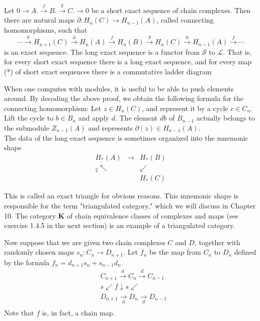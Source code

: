   
  \begin{theo}
      Let $0 \rightarrow A . \xrightarrow{f} B . \xrightarrow{g} C . \rightarrow 0$ be a short exact sequence of chain complexes. Then there are natural maps $\partial: H_n(C) \rightarrow H_{n-1}(A)$, called connecting homomorphisms, such that
      $$
      \cdots \xrightarrow{g} H_{n+1}(C) \xrightarrow{\partial} H_n(A) \xrightarrow{f} H_n(B) \xrightarrow{g} H_n(C) \xrightarrow{\partial} H_{n-1}(A) \xrightarrow{f} \cdots
      $$
      is an exact sequence. The long exact sequence is a functor from $\mathcal{S}$ to $\mathcal{L}$. That is, for every short exact sequence there is a long exact sequence, and for every map (*) of short exact sequences there is a commutative ladder diagram
      \end{theo}
      
      When one computes with modules, it is useful to be able to push elements around. By decoding the above proof, we obtain the following formula for the connecting homomorphism: Let $z \in H_n(C)$, and represent it by a cycle $c \in C_n$. Lift the cycle to $b \in B_n$ and apply $d$. The element $d b$ of $B_{n-1}$ actually belongs to the submodule $Z_{n-1}(A)$ and represents $\partial(z) \in H_{n-1}(A)$.\\

The data of the long exact sequence is sometimes organized into the mnemonic shape
      $$
      \begin{array}{ccc}
      H_*(A) & \longrightarrow & H_*(B) \\
      { }_2 \nwarrow & & \swarrow \\
      & & H_*(C)
      \end{array}
      $$
      
      This is called an exact triangle for obvious reasons. This mnemonic shape is responsible for the term "triangulated category," which we will discuss in Chapter 10. The category $\mathbf{K}$ of chain equivalence classes of complexes and maps (see exercise 1.4.5 in the next section) is an example of a triangulated category.


      Now suppose that we are given two chain complexes $C$ and $D$, together with randomly chosen maps $s_n: C_n \rightarrow D_{n+1}$. Let $f_n$ be the map from $C_n$ to $D_n$ defined by the formula $f_n=d_{n+1} s_n+s_{n-1} d_n$.
      $$
      \begin{aligned}
      & C_{n+1} \xrightarrow{d} C_n \xrightarrow{d} C_{n-1} \\
      & s \swarrow f \downarrow s \swarrow \\
      & D_{n+1} \underset{d}{\longrightarrow} D_n \underset{d}{\longrightarrow} D_{n-1} \\
      &
      \end{aligned}
      $$ Note that $f$ is, in fact, a chain map.

